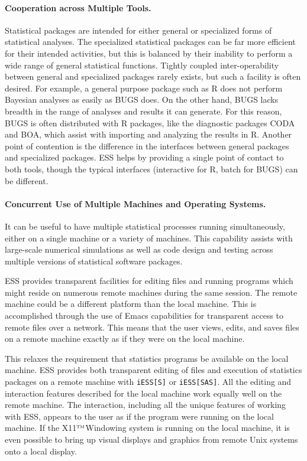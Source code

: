 \documentclass{article}
\newcommand*{\tm}{$^{\mbox{\scriptsize\sc tm}}$}
\newcommand{\stexttt}[1]{{\small\texttt{#1}}}
\begin{document}
\paragraph{Cooperation across Multiple Tools.}
Statistical packages are intended for either general or specialized
forms of statistical analyses.  The specialized statistical packages
can be far more efficient for their intended activities, but this is
balanced by their inability to perform a wide range of general
statistical functions.  Tightly coupled inter-operability between
general and specialized packages rarely exists, but such a facility is
often desired.  For example, a general purpose package such as R does
not perform Bayesian analyses as easily as BUGS does.  On the other
hand, BUGS lacks breadth in the range of analyses and results it can
generate.  For this reason, BUGS is often distributed with R packages,
like the diagnostic packages CODA and BOA, which assist with importing
and analyzing the results in R.  Another point of contention is the
difference in the interfaces between general packages and specialized
packages.  ESS helps by providing a single point of contact to both
tools, though the typical interfaces (interactive for R, batch for
BUGS) can be different.

\paragraph{Concurrent Use of Multiple Machines and Operating Systems.}
It can be useful to have multiple statistical processes running
simultaneously, either on a single machine or a variety of machines.
This capability assists with large-scale numerical simulations as well
as code design and testing across multiple versions of statistical
software packages.

ESS provides transparent facilities for editing files and running
programs which might reside on numerous remote machines during the
same session.  The remote machine could be a different platform than
the local machine.  This is accomplished through the use of Emacs
capabilities for transparent access to remote files over a network.
This means that the user views, edits, and saves files on a remote
machine exactly as if they were on the local machine.

This relaxes the requirement that statistics programs be available on
the local machine.  ESS provides both transparent editing of files and
execution of statistics packages on a remote machine with
\stexttt{iESS[S]} or \stexttt{iESS[SAS]}.  All the editing and
interaction features described for the local machine work equally well
on the remote machine.  The interaction, including all the unique
features of working with ESS, appears to the user as if the program
were running on the local machine.  If the X11\tm Windowing system is
running on the local machine, it is even possible to bring up visual
displays and graphics from remote Unix systems onto a local display.
\end{document}
